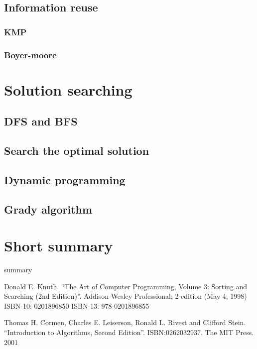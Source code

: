 \documentclass{article}
\begin{document}
\subsection{Information reuse}

\subsubsection{KMP}

\subsubsection{Boyer-moore}

\section{Solution searching}
\subsection{DFS and BFS}

\subsection{Search the optimal solution}

\subsection{Dynamic programming}

\subsection{Grady algorithm}

\section{Short summary} 
summary

\begin{thebibliography}{99}

Donald E. Knuth. ``The Art of Computer Programming, Volume 3: Sorting and Searching (2nd Edition)''. Addison-Wesley Professional; 2 edition (May 4, 1998) ISBN-10: 0201896850 ISBN-13: 978-0201896855

Thomas H. Cormen, Charles E. Leiserson, Ronald L. Rivest and Clifford Stein. 
``Introduction to Algorithms, Second Edition''. ISBN:0262032937. The MIT Press. 2001

\end{thebibliography}

\ifx\wholebook\relax\else
\end{document}
